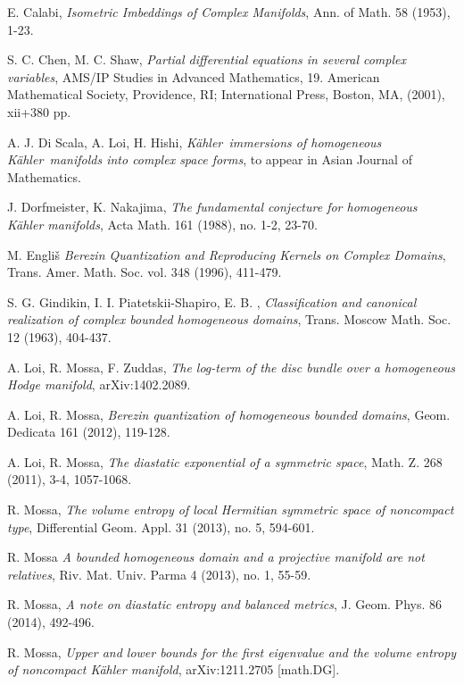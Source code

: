 \documentclass[reqno]{amsart}
\begin{document}
\begin{thebibliography}{99}

 E. Calabi,
\emph{ Isometric Imbeddings of Complex Manifolds},
Ann. of Math. 58 (1953), 1-23.

 S. C. Chen, M. C. Shaw, 
{\em Partial differential equations in several complex variables},
AMS/IP Studies in Advanced Mathematics,  19. American Mathematical Society, Providence, RI; International Press, Boston, MA, (2001), xii+380 pp.

 {A. J. Di Scala}, { A. Loi}, {H. Hishi},
{\em {K\"{a}hler}\ immersions of homogeneous {K\"{a}hler}\ manifolds into complex space forms}, to appear in Asian Journal of Mathematics.

J. Dorfmeister,  K. Nakajima,
{\em The fundamental conjecture for homogeneous K\"ahler manifolds},
Acta Math.  161  (1988),  no. 1-2, 23-70.

 M. Engli\v{s} 
\emph{Berezin Quantization and Reproducing Kernels on Complex Domains},
Trans. Amer. Math. Soc. vol. 348 (1996), 411-479.

 S. G. Gindikin, I. I. Piatetskii-Shapiro, E. B. ,
{\em Classification and canonical realization of complex bounded
homogeneous domains},
Trans. Moscow Math. Soc. {12} (1963), 404-437.

 A. Loi, R. Mossa, F. Zuddas,
\emph{The log-term of the disc bundle over a homogeneous Hodge manifold}, arXiv:1402.2089.

 A. Loi, R. Mossa,
\emph{Berezin quantization of homogeneous bounded domains}, Geom. Dedicata 161 (2012), 119-128.

 A. Loi, R. Mossa,
{\em The diastatic exponential of a symmetric space},
Math. Z. 268 (2011), 3-4, 1057-1068. 

 R. Mossa,
\emph {The volume entropy of local Hermitian symmetric space of noncompact type}, Differential Geom. Appl. 31 (2013), no. 5, 594-601.

 R. Mossa
\emph{A bounded homogeneous domain and a projective manifold are not relatives}, Riv. Mat. Univ. Parma 4 (2013), no. 1, 55-59.

 R. Mossa, 
\emph{A note on diastatic entropy and balanced metrics},   J. Geom. Phys. 86 (2014),  492-496.  

 R. Mossa,
\emph{Upper and lower bounds for the first eigenvalue and the volume entropy of noncompact  K\"ahler manifold},  arXiv:1211.2705 [math.DG].


\end{thebibliography}
\end{document}
